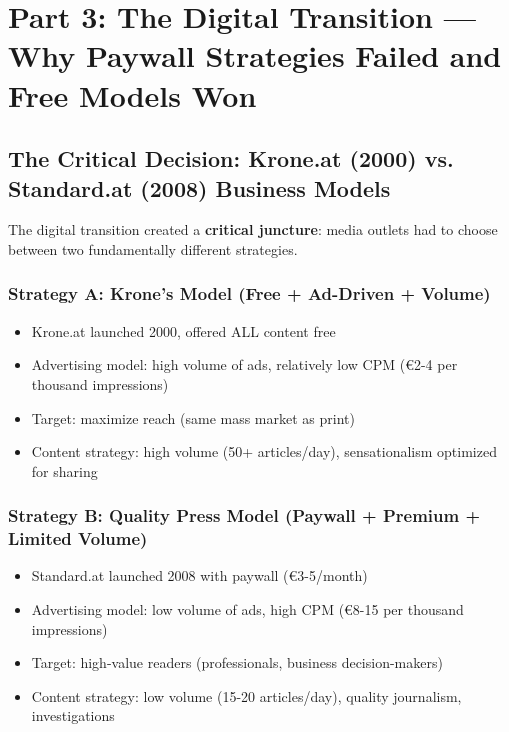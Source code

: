 {%

\section*{Part 3: The Digital Transition --- Why Paywall Strategies Failed and Free Models Won}

\subsection*{The Critical Decision: Krone.at (2000) vs. Standard.at (2008) Business Models}

The digital transition created a \textbf{critical juncture}: media outlets had to choose between two
fundamentally different strategies.

\subsubsection*{Strategy A: Krone's Model (Free + Ad-Driven + Volume)}

\begin{itemize}
\item Krone.at launched 2000, offered ALL content free
\item Advertising model: high volume of ads, relatively low CPM (€2-4 per thousand impressions)
\item Target: maximize reach (same mass market as print)
\item Content strategy: high volume (50+ articles/day), sensationalism optimized for sharing
\end{itemize}

\subsubsection*{Strategy B: Quality Press Model (Paywall + Premium + Limited Volume)}

\begin{itemize}
\item Standard.at launched 2008 with paywall (€3-5/month)
\item Advertising model: low volume of ads, high CPM (€8-15 per thousand impressions)
\item Target: high-value readers (professionals, business decision-makers)
\item Content strategy: low volume (15-20 articles/day), quality journalism, investigations
\end{itemize}

}
